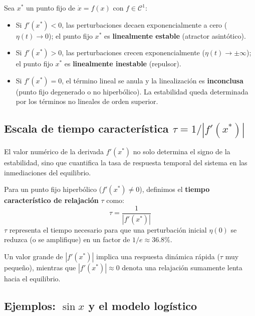 \begin{theorem}
    Sea $x^*$ un punto fijo de $\dot{x} = f(x)$ con $f \in \mathcal{C}^1$:
    \begin{itemize}
        \item Si $f'(x^*) < 0$, las perturbaciones decaen exponencialmente a cero ($\eta(t) \to 0$); el punto fijo $x^*$ es \textbf{linealmente estable} (atractor asintótico).
        \item Si $f'(x^*) > 0$, las perturbaciones crecen exponencialmente ($\eta(t) \to \pm\infty$); el punto fijo $x^*$ es \textbf{linealmente inestable} (repulsor).
        \item Si $f'(x^*) = 0$, el término lineal se anula y la linealización es \textbf{inconclusa} (punto fijo degenerado o no hiperbólico). La estabilidad queda determinada por los términos no lineales de orden superior.
    \end{itemize}
\end{theorem}

\subsection{Escala de tiempo característica $\tau = 1/|f'(x^{*})|$}

El valor numérico de la derivada $f'(x^*)$ no solo determina el signo de la estabilidad, sino que cuantifica la tasa de respuesta temporal del sistema en las inmediaciones del equilibrio.

\begin{definition}
    Para un punto fijo hiperbólico ($f'(x^*) \neq 0$), definimos el \textbf{tiempo característico de relajación} $\tau$ como:
    \begin{equation}
        \tau = \frac{1}{|f'(x^*)|}
        \label{eq:tiempo_caracteristico}
    \end{equation}
    $\tau$ representa el tiempo necesario para que una perturbación inicial $\eta(0)$ se reduzca (o se amplifique) en un factor de $1/e \approx 36.8\%$.
\end{definition}

Un valor grande de $|f'(x^*)|$ implica una respuesta dinámica rápida ($\tau$ muy pequeño), mientras que $|f'(x^*)| \approx 0$ denota una relajación sumamente lenta hacia el equilibrio.

\subsection{Ejemplos: $\sin x$ y el modelo logístico}

